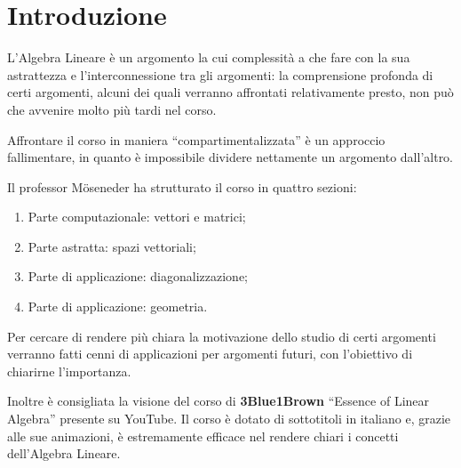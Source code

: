 \chapter*{Introduzione}
L'Algebra Lineare è un argomento la cui complessità a che fare con la sua astrattezza e l'interconnessione tra gli argomenti: la comprensione profonda di certi argomenti, alcuni dei quali verranno affrontati relativamente presto, non può che avvenire molto più tardi nel corso.

Affrontare il corso in maniera ``compartimentalizzata'' è un approccio fallimentare, in quanto è impossibile dividere nettamente un argomento dall'altro.

Il professor Möseneder ha strutturato il corso in quattro sezioni:
\begin{enumerate}
    \item Parte computazionale: vettori e matrici;
    \item Parte astratta: spazi vettoriali;
    \item Parte di applicazione: diagonalizzazione;
    \item Parte di applicazione: geometria.
\end{enumerate}

Per cercare di rendere più chiara la motivazione dello studio di certi argomenti verranno fatti cenni di applicazioni per argomenti futuri, con l'obiettivo di chiarirne l'importanza.

Inoltre è consigliata la visione del corso di \textbf{3Blue1Brown} ``Essence of Linear Algebra'' presente su YouTube. Il corso è dotato di sottotitoli in italiano e, grazie alle sue animazioni, è estremamente efficace nel rendere chiari i concetti dell'Algebra Lineare.